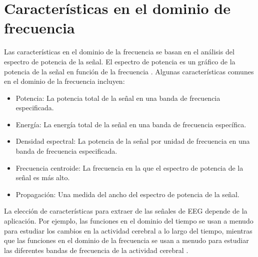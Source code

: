 \section{Características en el dominio de frecuencia}
Las características en el dominio de la frecuencia se basan en el análisis del espectro de potencia de la señal. El espectro de potencia es un gráfico de la potencia de la señal en función de la frecuencia \cite{carac_freq}. Algunas características comunes en el dominio de la frecuencia incluyen:
\begin{itemize}
    \item Potencia: 
    La potencia total de la señal en una banda de frecuencia especificada.
    \item Energía: 
    La energía total de la señal en una banda de frecuencia específica.
    \item Densidad espectral: 
    La potencia de la señal por unidad de frecuencia en una banda de frecuencia especificada.
    \item Frecuencia centroide: 
    La frecuencia en la que el espectro de potencia de la señal es más alto.
    \item Propagación: 
    Una medida del ancho del espectro de potencia de la señal.
\end{itemize}

La elección de características para extraer de las señales de EEG depende de la aplicación. Por ejemplo, las funciones en el dominio del tiempo se usan a menudo para estudiar los cambios en la actividad cerebral a lo largo del tiempo, mientras que las funciones en el dominio de la frecuencia se usan a menudo para estudiar las diferentes bandas de frecuencia de la actividad cerebral \cite{al2014methods}.


